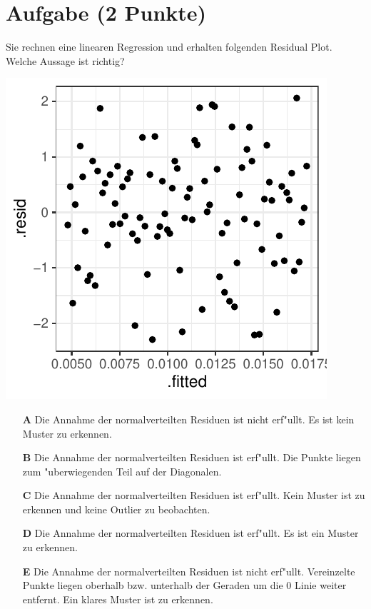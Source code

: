 \documentclass[a4paper, 10pt]{scrartcl}\usepackage[]{graphicx}\usepackage[]{xcolor}
\makeatletter
\def\maxwidth{ %
  \ifdim\Gin@nat@width>\linewidth
    \linewidth
  \else
    \Gin@nat@width
  \fi
}
\makeatother
\begin{document}
\section{Aufgabe \hfill (2 Punkte)}

Sie rechnen eine linearen Regression und erhalten folgenden Residual
Plot. Welche Aussage ist richtig?




{\centering \includegraphics[width=\maxwidth]{img/mc-regression-06-a-1} 

}







\begin{enumerate}
\item [\textbf{A} \msquare] Die Annahme der normalverteilten Residuen ist nicht erf{"u}llt. Es ist kein Muster zu erkennen.
\item [\textbf{B} \msquare] Die Annahme der normalverteilten Residuen ist erf{"u}llt. Die Punkte liegen zum {"u}berwiegenden Teil auf der Diagonalen.
\item [\textbf{C} \msquare] Die Annahme der normalverteilten Residuen ist erf{"u}llt. Kein Muster ist zu erkennen und keine Outlier zu beobachten.
\item [\textbf{D} \msquare] Die Annahme der normalverteilten Residuen ist erf{"u}llt. Es ist ein Muster zu erkennen.
\item [\textbf{E} \msquare] Die Annahme der normalverteilten Residuen ist nicht erf{"u}llt. Vereinzelte Punkte liegen oberhalb bzw. unterhalb der Geraden um die 0 Linie weiter entfernt. Ein klares Muster ist zu erkennen.
\end{enumerate}
\end{document}
